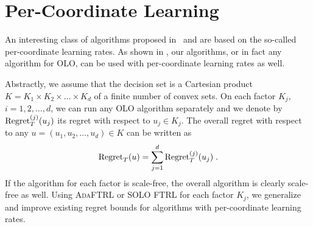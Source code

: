 \section{Per-Coordinate Learning}

An interesting class of algorithms proposed in~\cite{McMahan-Streeter-2010} and
\cite{Duchi-Hazan-Singer-2011} are based on the so-called per-coordinate
learning rates.  As shown in \cite{Streeter-McMahan-2010}, our algorithms, or
in fact any algorithm for OLO, can be used with per-coordinate
learning rates as well.

Abstractly, we assume that the decision set is a Cartesian product $K=K_1
\times K_2 \times \dots \times K_d$ of a finite number of convex sets.  On each
factor $K_j$, $i=1,2,\dots,d$, we can run any OLO algorithm separately and we
denote by $\operatorname{Regret}_T^{(j)}(u_j)$ its regret with respect to $u_j \in K_j$. The
overall regret with respect to any $u=(u_1, u_2, \dots, u_d) \in K$ can be
written as
$$
\operatorname{Regret}_T(u) = \sum_{j=1}^d \operatorname{Regret}_T^{(j)}(u_j) \; .
$$
If the algorithm for each factor is scale-free, the overall algorithm is
clearly scale-free as well.  Using \textsc{AdaFTRL} or \textsc{SOLO FTRL} for
each factor $K_j$, we generalize and improve existing regret bounds
\cite{McMahan-Streeter-2010,Duchi-Hazan-Singer-2011} for algorithms with per-coordinate
learning rates.
